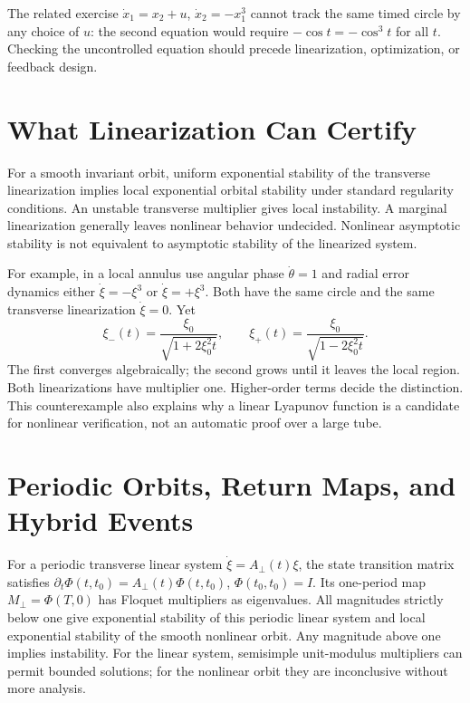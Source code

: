 The related exercise $\dot x_1=x_2+u$, $\dot x_2=-x_1^3$ cannot track the
same timed circle by any choice of $u$: the second equation would require
$-\cos t=-\cos^3t$ for all $t$. Checking the uncontrolled equation should
precede linearization, optimization, or feedback design.

\section{What Linearization Can Certify}

For a smooth invariant orbit, uniform exponential stability of the transverse
linearization implies local exponential orbital stability under standard
regularity conditions. An unstable transverse multiplier gives local
instability. A marginal linearization generally leaves nonlinear behavior
undecided. Nonlinear asymptotic stability is not equivalent to asymptotic
stability of the linearized system.

For example, in a local annulus use angular phase $\dot\theta=1$ and radial
error dynamics either $\dot\xi=-\xi^3$ or $\dot\xi=+\xi^3$. Both have the
same circle and the same transverse linearization $\dot\xi=0$. Yet
\begin{equation}\label{eq:orbital_nonlinear_marginal}
 \xi_-(t)=\frac{\xi_0}{\sqrt{1+2\xi_0^2t}},\qquad
 \xi_+(t)=\frac{\xi_0}{\sqrt{1-2\xi_0^2t}}.
\end{equation}
The first converges algebraically; the second grows until it leaves the local
region. Both linearizations have multiplier one. Higher-order terms decide
the distinction. This counterexample also explains why a linear Lyapunov
function is a candidate for nonlinear verification, not an automatic proof
over a large tube.

\section{Periodic Orbits, Return Maps, and Hybrid Events}

For a periodic transverse linear system $\dot\xi=A_\perp(t)\xi$, the state
transition matrix satisfies $\partial_t\Phi(t,t_0)=A_\perp(t)\Phi(t,t_0)$,
$\Phi(t_0,t_0)=I$. Its one-period map $M_\perp=\Phi(T,0)$ has Floquet
multipliers as eigenvalues. All magnitudes strictly below one give exponential
stability of this periodic linear system and local exponential stability of
the smooth nonlinear orbit. Any magnitude above one implies instability.
For the linear system, semisimple unit-modulus multipliers can permit bounded
solutions; for the nonlinear orbit they are inconclusive without more analysis.

